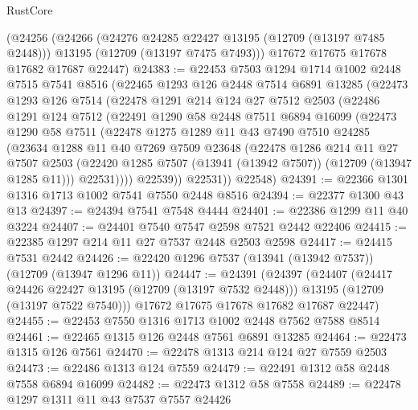 \begin{lexlean}{RustCore}
\begin{coremodule}
    (@24256
      (@24266
        (@24276 @24285 @22427 @13195 (@12709 (@13197 @7485 @2448)))
        @13195
        (@12709 (@13197 @7475 @7493)))
      @17672
      @17675
      @17678
      @17682
      @17687
      @22447)
@24383 := @22453
    @7503
    @1294
    @1714
    @1002
    @2448
    @7515
    @7541
    @8516
    (@22465
      @1293
      @126
      @2448
      @7514
      @6891
      @13285
      (@22473
        @1293
        @126
        @7514
        (@22478
          @1291
          @214
          @124
          @27
          @7512
          @2503
          (@22486
            @1291
            @124
            @7512
            (@22491
              @1290
              @58
              @2448
              @7511
              @6894
              @16099
              (@22473
                @1290
                @58
                @7511
                (@22478
                  @1275
                  @1289
                  @11
                  @43
                  @7490
                  @7510
                  @24285
                  (@23634
                    @1288
                    @11
                    @40
                    @7269
                    @7509
                    @23648
                    (@22478
                      @1286
                      @214
                      @11
                      @27
                      @7507
                      @2503
                      (@22420 @1285 @7507 (@13941 (@13942 @7507)) (@12709 (@13947 @1285 @11)))
                      @22531))))
              @22539))
          @22531))
      @22548)
@24391 := @22366 @1301 @1316 @1713 @1002 @7541 @7550 @2448 @8516
@24394 := @22377 @1300 @43 @13
@24397 := @24394 @7541 @7548 @4444
@24401 := @22386 @1299 @11 @40 @3224
@24407 := @24401 @7540 @7547 @2598 @7521 @2442 @22406
@24415 := @22385 @1297 @214 @11 @27 @7537 @2448 @2503 @2598
@24417 := @24415 @7531 @2442
@24426 := @22420 @1296 @7537 (@13941 (@13942 @7537)) (@12709 (@13947 @1296 @11))
@24447 := @24391
    (@24397
      (@24407
        (@24417 @24426 @22427 @13195 (@12709 (@13197 @7532 @2448)))
        @13195
        (@12709 (@13197 @7522 @7540)))
      @17672
      @17675
      @17678
      @17682
      @17687
      @22447)
@24455 := @22453 @7550 @1316 @1713 @1002 @2448 @7562 @7588 @8514
@24461 := @22465 @1315 @126 @2448 @7561 @6891 @13285
@24464 := @22473 @1315 @126 @7561
@24470 := @22478 @1313 @214 @124 @27 @7559 @2503
@24473 := @22486 @1313 @124 @7559
@24479 := @22491 @1312 @58 @2448 @7558 @6894 @16099
@24482 := @22473 @1312 @58 @7558
@24489 := @22478 @1297 @1311 @11 @43 @7537 @7557 @24426

\end{coremodule}
\end{lexlean}
